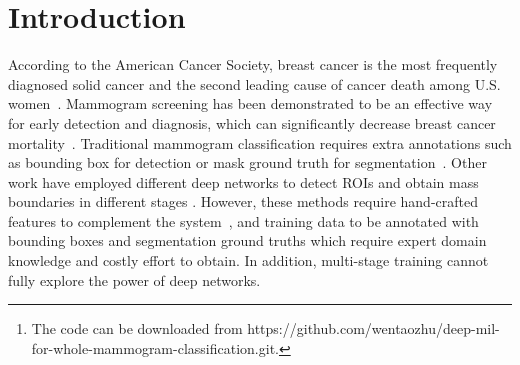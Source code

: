 \documentclass[runningheads,a4paper]{llncs}
\newcommand{\keywords}[1]{\par\addvspace\baselineskip
\noindent\keywordname\enspace\ignorespaces#1}
\begin{document}
\begin{abstract}
  Mammogram classification is directly related to computer-aided diagnosis of breast cancer. Traditional methods rely on regions of interest (ROIs) which require great efforts to annotate. Inspired by the success of using deep convolutional features for natural image analysis and multi-instance learning (MIL) for labeling a set of instances/patches, we propose end-to-end trained deep multi-instance networks for mass classification based on whole mammogram without the aforementioned ROIs. We explore three different schemes to construct deep multi-instance networks for whole mammogram classification. Experimental results on the INbreast dataset demonstrate the robustness of proposed networks compared to previous work using segmentation and detection annotations. \footnote[1]{The code can be downloaded from https://github.com/wentaozhu/deep-mil-for-whole-mammogram-classification.git.}
\keywords{Deep multi-instance learning, whole mammogram classification, max pooling-based MIL, label assignment-based MIL, sparse MIL} %
\end{abstract}
\section{Introduction}\label{sec:intro}
According to the American Cancer Society, breast cancer is the most frequently diagnosed solid cancer and the second leading cause of cancer death among U.S. women~\cite{acs}. Mammogram screening has been demonstrated to be an effective way for early detection and diagnosis, which can significantly decrease breast cancer mortality~\cite{oeffinger2015breast}. Traditional mammogram classification requires extra annotations such as bounding box for detection or mask ground truth for segmentation~\cite{varela2006use,carneiro2015unregistered,jiao2016deep}. Other work have employed different deep networks to detect ROIs and obtain mass boundaries in different stages \cite{dhungel2016automated}. However, these methods require hand-crafted features to complement the system~\cite{kooi2017large}, and training data to be annotated with bounding boxes and segmentation ground truths which require expert domain knowledge and costly effort to obtain. In addition, multi-stage training cannot fully explore the power of deep networks. %
\end{document}
